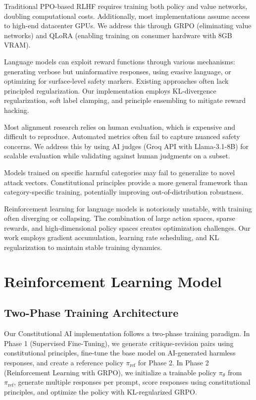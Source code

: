 \documentclass[conference]{IEEEtran}
\begin{document}
Traditional PPO-based RLHF requires training both policy and value networks, doubling computational costs. Additionally, most implementations assume access to high-end datacenter GPUs. We address this through GRPO (eliminating value networks) and QLoRA (enabling training on consumer hardware with 8GB VRAM).

Language models can exploit reward functions through various mechanisms: generating verbose but uninformative responses, using evasive language, or optimizing for surface-level safety markers. Existing approaches often lack principled regularization. Our implementation employs KL-divergence regularization, soft label clamping, and principle ensembling to mitigate reward hacking.

Most alignment research relies on human evaluation, which is expensive and difficult to reproduce. Automated metrics often fail to capture nuanced safety concerns. We address this by using AI judges (Groq API with Llama-3.1-8B) for scalable evaluation while validating against human judgments on a subset.

Models trained on specific harmful categories may fail to generalize to novel attack vectors. Constitutional principles provide a more general framework than category-specific training, potentially improving out-of-distribution robustness.

Reinforcement learning for language models is notoriously unstable, with training often diverging or collapsing. The combination of large action spaces, sparse rewards, and high-dimensional policy spaces creates optimization challenges. Our work employs gradient accumulation, learning rate scheduling, and KL regularization to maintain stable training dynamics.


\section{Reinforcement Learning Model}

\subsection{Two-Phase Training Architecture}

Our Constitutional AI implementation follows a two-phase training paradigm. In Phase 1 (Supervised Fine-Tuning), we generate critique-revision pairs using constitutional principles, fine-tune the base model on AI-generated harmless responses, and create a reference policy $\pi_{\text{ref}}$ for Phase 2. In Phase 2 (Reinforcement Learning with GRPO), we initialize a trainable policy $\pi_\theta$ from $\pi_{\text{ref}}$, generate multiple responses per prompt, score responses using constitutional principles, and optimize the policy with KL-regularized GRPO.
\end{document}
